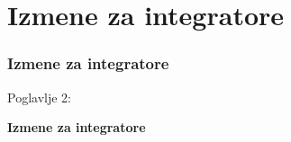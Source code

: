 %

\section{Izmene za integratore}
\begin{frame}[fragile]
	\frametitle{Izmene za integratore}

	\begin{center}\huge{Poglavlje 2:}\end{center}
	\begin{center}\huge{\color{typo3darkgrey}\textbf{Izmene za integratore}}\end{center}

\end{frame}

